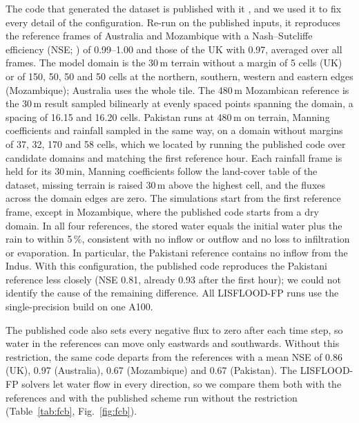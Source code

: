 \documentclass[draft,linenumbers]{agujournal2025}
\begin{document}
The code that generated the dataset is published with it
\cite{Xu2025floodcastbenchcode}, and we used it to fix every detail of the
configuration. Re-run on the published inputs, it reproduces the reference
frames of Australia and Mozambique with a Nash--Sutcliffe efficiency (NSE;
) of 0.99--1.00 and those of the UK with 0.97,
averaged over all frames. The model domain is the 30\,m terrain without a
margin of 5 cells (UK) or of 150, 50, 50 and 50 cells at the northern,
southern, western and eastern edges (Mozambique); Australia uses the whole
tile. The 480\,m Mozambican reference is the 30\,m result sampled bilinearly
at evenly spaced points spanning the domain, a spacing of 16.15 and 16.20 cells.
Pakistan runs at 480\,m on terrain, Manning coefficients and rainfall
sampled in the same way, on a domain without margins of 37, 32, 170 and
58 cells, which we located by running the published code over candidate
domains and matching the first reference hour. Each rainfall frame is held
for its 30\,min, Manning coefficients follow the land-cover table of the
dataset, missing terrain is raised 30\,m above the highest cell, and the
fluxes across the domain edges are zero. The simulations start from the
first reference frame, except in Mozambique, where the published code
starts from a dry domain. In all four references, the stored water equals
the initial water plus the rain to within 5\,\%, consistent with no
inflow or outflow and no loss to infiltration or evaporation. In particular, the
Pakistani reference contains no inflow from the Indus. With this
configuration, the published code reproduces the Pakistani reference less
closely (NSE 0.81, already 0.93 after the first hour); we could not identify
the cause of the remaining difference.
All LISFLOOD-FP runs use the single-precision build on one A100.

The published code also sets every negative flux to zero after each time
step, so water in the references can move only eastwards and southwards.
Without this restriction, the same code departs from the references with
a mean NSE of 0.86 (UK), 0.97 (Australia), 0.67 (Mozambique) and 0.67
(Pakistan). The LISFLOOD-FP solvers let water flow in every direction, so
we compare them both with the references and with the published scheme
run without the restriction (Table~\ref{tab:fcb}, Fig.~\ref{fig:fcb}).
\end{document}
